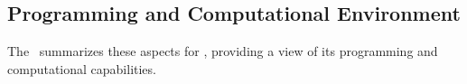 \subsection{Programming and Computational Environment}
\label{sec::Feelpp:environment_capabilities}

The~ summarizes these aspects for \Feelpp, providing a view of its programming and computational capabilities.

